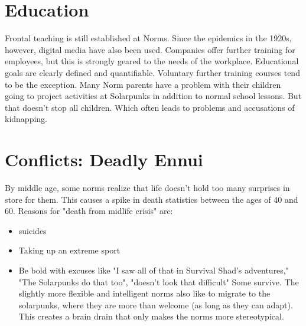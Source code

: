 \section{Education}
Frontal teaching is still established at Norms. Since the epidemics in the 1920s, however, digital media have also been used. Companies offer further training for employees, but this is strongly geared to the needs of the workplace.
Educational goals are clearly defined and quantifiable. Voluntary further training courses tend to be the exception. Many Norm parents have a problem with their children going to project activities at Solarpunks in addition to normal school lessons. But that doesn't stop all children. Which often leads to problems and accusations of kidnapping.

\section{Conflicts: Deadly Ennui}
By middle age, some norms realize that life doesn't hold too many surprises in store for them.
This causes a spike in death statistics between the ages of 40 and 60. Reasons for "death from midlife crisis" are:
\begin{itemize}
    \item suicides
    \item Taking up an extreme sport
    \item Be bold with excuses like "I saw all of that in Survival Shad's adventures," "The Solarpunks do that too", "doesn't look that difficult" Some survive. The slightly more flexible and intelligent norms also like to migrate to the solarpunks, where they are more than welcome (as long as they can adapt). This creates a brain drain that only makes the norms more stereotypical.
\end{itemize}


